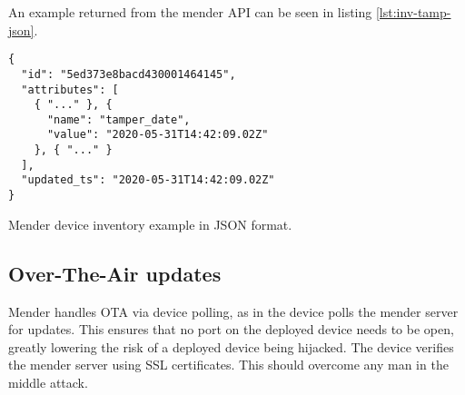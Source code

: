 \documentclass[../../main.tex]{subfiles}
\begin{document}
An example returned from the mender API can be seen in listing \ref{lst:inv-tamp-json}.

\begin{listing}
\begin{verbatim}
{
  "id": "5ed373e8bacd430001464145",
  "attributes": [
    { "..." }, {
      "name": "tamper_date",
      "value": "2020-05-31T14:42:09.02Z"
    }, { "..." }
  ],
  "updated_ts": "2020-05-31T14:42:09.02Z"
}
\end{verbatim}
\caption{Mender device inventory example in JSON format.}
\label{lst:inv-tamp-json}
\end{listing}



\subsection{Over-The-Air updates}%
\label{sub:over_the_air_updates}

Mender handles OTA via device polling, as in the device polls the mender server for updates.
This ensures that no port on the deployed device needs to be open, greatly lowering the risk of
a deployed device being hijacked.
The device verifies the mender server using SSL certificates.
This should overcome any man in the middle attack.




%
%
%
%
	
\end{document}
